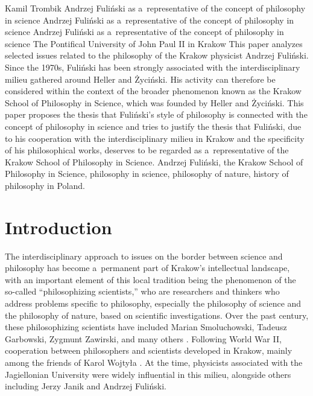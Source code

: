 \begin{artengenv}{Kamil Trombik}
	{Andrzej Fuliński as a~representative of the concept of philosophy in science}
	{Andrzej Fuliński as a~representative of the concept of philosophy in science}
	{Andrzej Fuliński as a~representative of the concept of philosophy in science}
	{The Pontifical University of John Paul II in Krakow}
	{This paper analyzes selected issues related to the philosophy of the Krakow physicist Andrzej Fuliński. Since the 1970s, Fuliński has been strongly associated with the interdisciplinary milieu gathered around Heller and Życiński. His activity can therefore be considered within the context of the broader phenomenon known as the Krakow School of Philosophy in Science, which was founded by Heller and Życiński. This paper proposes the thesis that Fuliński's style of philosophy is connected with the concept of philosophy in science and tries to justify the thesis that Fuliński, due to his cooperation with the interdisciplinary milieu in Krakow and the specificity of his philosophical works, deserves to be regarded as a~representative of the Krakow School of Philosophy in Science.
	\enlargethispage{1.5\baselineskip}}
	{Andrzej Fuliński, the Krakow School of Philosophy in Science, philosophy in science, philosophy of nature, history of philosophy in Poland.}


\vspace{-1.5\baselineskip}

\section*{Introduction}

\lettrine[loversize=0.13,lines=2,lraise=-0.03,nindent=0em,findent=0.2pt]%
{T}{}he interdisciplinary approach to issues on the border between science and philosophy has become a~permanent part of Krakow's intellectual landscape, with an important element of this local tradition being the phenomenon of the so-called ``philosophizing scientists,'' who are researchers and thinkers who address problems specific to philosophy, especially the philosophy of science and the philosophy of nature, based on scientific investigations. Over the past century, these philosophizing scientists have included Marian Smoluchowski, Tadeusz Garbowski, Zygmunt Zawirski, and many others 
\parencites[sefor exampl][]{heller_krakowska_2007}[][]{polak_u_2011}[][]{polak_19th_2011}[][]{polak_tradycja_2018}. %
 Following World War II, cooperation between philosophers and scientists developed in Krakow, mainly among the friends of Karol Wojtyła 
\parencites[][]{heller_poczatki_2006}[][]{trombik_koncepcje_2021}[][]{trombik_stworzyc_2022}. %
 At the time, physicists associated with the Jagiellonian University were widely influential in this milieu, alongside others including Jerzy Janik and Andrzej Fuliński.




\end{artengenv}
